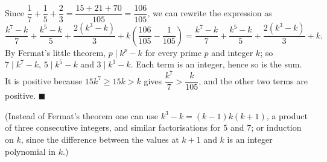 Since $\dfrac{1}{7}+\dfrac{1}{5}+\dfrac{2}{3}=\dfrac{15+21+70}{105}=\dfrac{106}{105}$, we can rewrite the expression as
\[
\dfrac{k^7-k}{7}+\dfrac{k^5-k}{5}+\dfrac{2\left(k^3-k\right)}{3}+k\left(\dfrac{106}{105}-\dfrac{1}{105}\right)=\dfrac{k^7-k}{7}+\dfrac{k^5-k}{5}+\dfrac{2\left(k^3-k\right)}{3}+k .
\]
By Fermat's little theorem, $p\mid k^p-k$ for every prime $p$ and integer $k$; so $7\mid k^7-k$, $5\mid k^5-k$ and $3\mid k^3-k$. Each term is an integer, hence so is the sum. It is positive because $15k^7\ge15k>k$ gives $\dfrac{k^7}{7}>\dfrac{k}{105}$, and the other two terms are positive. $\blacksquare$

(Instead of Fermat's theorem one can use $k^3-k=(k-1)k(k+1)$, a product of three consecutive integers, and similar factorisations for $5$ and $7$; or induction on $k$, since the difference between the values at $k+1$ and $k$ is an integer polynomial in $k$.)
